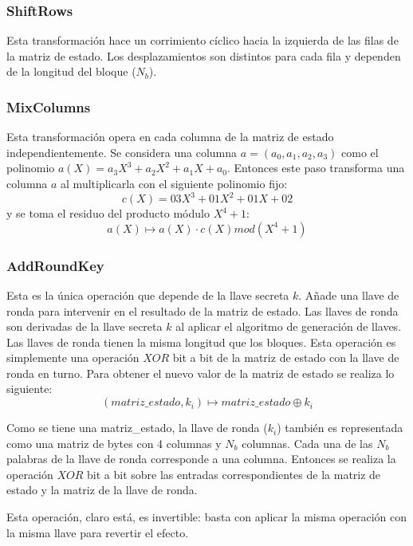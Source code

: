 \subsubsection{ShiftRows}
Esta transformación hace un corrimiento cíclico hacia la izquierda de las
filas de la matriz de estado. Los desplazamientos son distintos para cada
fila y dependen de la longitud del bloque ($N_b$).

\subsubsection{MixColumns}
Esta transformación opera en cada columna de la matriz de estado 
independientemente. Se considera una columna $a = (a_0, a_1, a_2, a_3)$ 
como el polinomio $a(X) = a_3X^3 + a_2X^2 + a_1X + a_0$. 
Entonces este paso transforma una columna $a$ al multiplicarla con el 
siguiente polinomio fijo:
\begin{equation}
  \label{cifrado_aes_poli}
 	c(X) = 03X^3 + 01X^2 + 01X+ 02
\end{equation}
y se toma el residuo del producto módulo $X^4+1$:
\begin{equation}
  \label{cifrado_aes_mix}
 	a(X) \mapsto a(X) \cdotp c(X) mod (X^4+1)
\end{equation}

\subsubsection{AddRoundKey}
Esta es la única operación que depende de la llave secreta $k$. Añade una
llave de ronda para intervenir en el resultado de la matriz de estado. 
Las llaves de ronda son derivadas de la llave secreta $k$ al aplicar el 
algoritmo de generación de llaves. Las llaves de ronda tienen la misma
longitud que los bloques. Esta operación es simplemente una operación 
$XOR$ bit a bit de la matriz de estado con la llave de ronda en turno.
Para obtener el nuevo valor de la matriz de estado se realiza lo
siguiente:
\begin{equation}
  \label{cifrado_aes_addkey}
 	(matriz\_estado, k_i) \mapsto matriz\_estado \oplus k_i
\end{equation}

Como se tiene una matriz\_estado, la llave de ronda ($k_i$) también
es representada como una matriz de bytes con 4 columnas y $N_b$ columnas.
Cada una de las $N_b$ palabras de la llave de ronda corresponde a una 
columna. Entonces se realiza la operación $XOR$ bit a bit sobre las 
entradas correspondientes de la matriz de estado y la matriz de la llave 
de ronda.

Esta operación, claro está, es invertible: basta con aplicar la misma
operación con la misma llave para revertir el efecto.